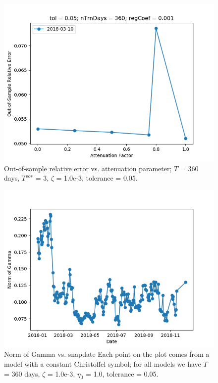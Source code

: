 \documentclass{article}
\begin{document}
\begin{figure}
\includegraphics[scale=0.9,bb=0 0 640 480]{figures/atnFct-sensitivity-oos-error.png}
\caption{Out-of-sample relative error vs. attenuation parameter; $T$ =
  360 days, $T^{oos}$ = 3, $\zeta$ = 1.0e-3, tolerance = 0.05.}
\label{fig:atnFct-sensitivity-oos-error}
\end{figure}

\begin{figure}
\includegraphics[scale=0.9,bb=0 0 640 480]{figures/Gamma_time_2018.png}
\caption{Norm of Gamma vs. snapdate Each point on the plot comes from
  a model with a constant Christoffel symbol; for all models we have
  $T$ = 360 days, $\zeta$ = 1.0e-3, $\eta_{0}$ = 1.0, tolerance =
  0.05.}
\label{fig:gamma-time}
\end{figure}
\end{document}
